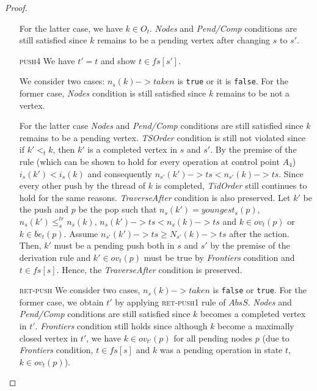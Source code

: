 \documentclass{article}
\begin{document}
\begin{proof}
\begin{itemize}
For the latter case, we have $k \in O_t$. \emph{Nodes} and \emph{Pend/Comp} conditions are still satisfied since $k$ remains to be a pending vertex after changing $s$ to $s'$.
\item[\textsc{push4}] We have $t' = t$ and show $t \in fs[s']$. 

We consider two cases: $n_s(k)->taken$ is \texttt{true} or it is \texttt{false}. For the former case, \emph{Nodes} condition is still satisfied since $k$ remains to be not a vertex. 

For the latter case \emph{Nodes} and \emph{Pend/Comp} conditions are still satisfied since $k$ remains to be a pending vertex. \emph{TSOrder} condition is still not violated since if $k'<_t k$, then $k'$ is a completed vertex in $s$ and $s'$. By the premise of the rule (which can be shown to hold for every operation at control point $A_4$) $i_s(k') < i_s(k)$ and consequently $n_{s'}(k')->ts < n_{s'}(k)->ts$. Since every other push by the thread of $k$ is completed, \emph{TidOrder} still continues to hold for the same reasons. \emph{TraverseAfter} condition is also preserved. Let $k'$ be the push and $p$ be the pop such that $n_s(k') = youngest_s(p)$, $n_s(k') \leq^{tr}_s n_s(k)$, $n_s(k')->ts < n_s(k)->ts$ and $k \in ov_t(p)$ or $k \in be_t(p)$. Assume $n_{s'}(k')->ts \geq N_{s'}(k)->ts$ after the action. Then, $k'$ must be a pending push both in $s$ and $s'$ by the premise of the derivation rule and $k' \in ov_t(p)$ must be true by \emph{Frontiers} condition and $t \in fs[s]$. Hence, the \emph{TraverseAfter} condition is preserved.
\item[\textsc{ret-push}] We consider two cases, $n_s(k)->taken$ is \texttt{false} or \texttt{true}. For the former case, we obtain $t'$ by applying \textsc{ret-push1} rule of $AbsS$. \emph{Nodes} and \emph{Pend/Comp} conditions are still satisfied since $k$ becomes a completed vertex in $t'$. \emph{Frontiers} condition still holds since although $k$ become a maximally closed vertex in $t'$, we have $k \in ov_{t'}(p)$ for all pending nodes $p$ (due to \emph{Frontiers} condition, $t \in fs[s]$ and $k$ was a pending operation in state $t$, $k \in ov_t(p)$). 


\end{itemize}
\end{proof}
\end{document}
